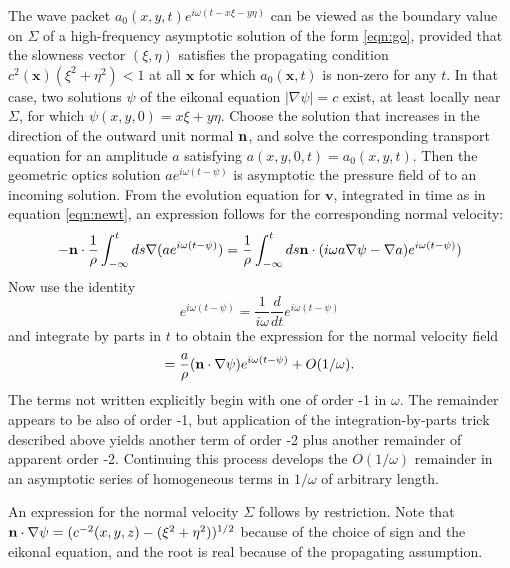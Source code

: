 \documentclass[georeport,12pt]{geophysics}
\newcommand{\bx}{\mathbf{x}}
\newcommand{\bv}{\mathbf{v}}
\begin{document}
The wave packet $a_0(x,y,t) e^{i\omega(t-x\xi-y\eta)}$ can be
viewed as the boundary value on $\Sigma$ of a
high-frequency asymptotic solution of the form \ref{eqn:go}, provided that the
slowness vector $(\xi, \eta)$ satisfies the propagating condition
$c^2(\bx)(\xi^2+\eta^2) < 1$ at all $\bx$ for
which $a_0(\bx,t)$ is non-zero for any $t$. In that case, two
solutions $\psi$ of the eikonal equation $|\nabla \psi|=c$ exist, at least locally near
$\Sigma$, for which $\psi(x,y,0)=x\xi+y\eta$. Choose the solution
that increases in the direction of the outward unit normal ${\bf
  n}$, and solve the corresponding transport equation for an
amplitude $a$ satisfying $a(x,y,0,t) = a_0(x,y,t)$. Then the geometric optics solution $a e^{i\omega(t-\psi)}$ is
asymptotic the pressure field of to an incoming solution. From the
evolution equation for $\bv$, integrated in time as in equation
\ref{eqn:newt},  an expression follows for the corresponding normal
velocity:
\[
  -{\bf n} \cdot \frac{1}{\rho}\int_{-\infty}^t ds \nabla (a
  e^{i\omega(t-\psi)})=\frac{1}{\rho}\int_{-\infty}^t ds {\bf n}
  \cdot(i\omega a\nabla \psi -\nabla a) e^{i\omega(t-\psi)})
\]
Now use the identity
\[
  e^{i\omega(t-\psi)} = \frac{1}{i\omega}\frac{d}{dt}e^{i\omega(t-\psi)}
\]
and integrate by parts in $t$ to obtain the expression for
the normal velocity field 
\[
  = \frac{a}{\rho} ({\bf n} \cdot \nabla \psi)  e^{i\omega(t-\psi)} + O(1/\omega).
\]
The terms not written explicitly begin with one of order -1 in
$\omega$. The remainder appears to be also of order -1, but
application of the integration-by-parts trick described above yields
another term of order -2 plus another remainder of apparent order
-2. Continuing this process develops the $O(1/\omega)$ remainder in an
asymptotic series of homogeneous terms in $1/\omega$ of arbitrary
length.

An expression for the normal velocity 
$\Sigma$ follows by restriction. Note that ${\bf n} \cdot \nabla \psi =( c^{-2}(x,y,z)-
(\xi^2+\eta^2))^{1/2}$ because of the choice of sign and the eikonal
equation, and the root is real because of the propagating assumption.
\end{document}
